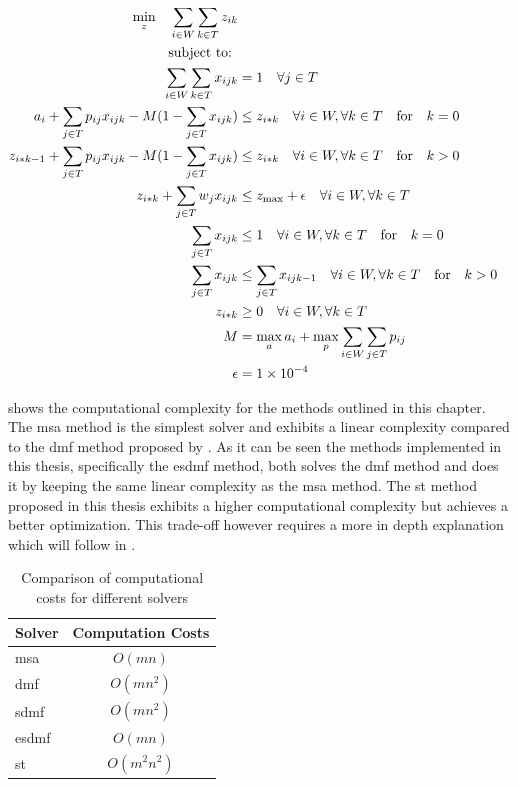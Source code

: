 \documentclass[draft=false]{seal_thesis}
\begin{document}
\begin{align}
    \min_z \quad \sum_{i \in W} \sum_{k \in T} z_{ik}\\
    \text{subject to: } \notag \\
    \sum_{i \in W} \sum_{k \in T} x_{ijk} &= 1 \quad \forall j \in T\\
    a_i + \sum_{j \in T} p_{ij} x_{ijk} - M(1 - \sum_{j \in T} x_{ijk}) &\leq z_{i*k} \quad \forall i \in W, \forall k \in T \quad \text{for} \quad k=0\\
    z_{i*k-1} + \sum_{j \in T} p_{ij} x_{ijk} - M(1 - \sum_{j \in T} x_{ijk}) &\leq z_{i*k} \quad \forall i \in W, \forall k \in T \quad \text{for} \quad k>0\\
    z_{i*k}+ \sum_{j \in T} w_j x_{ijk} &\leq z_{\text{max}} + \epsilon \quad \forall i \in W, \forall k \in T\\
    \sum_{j \in T} x_{ijk} &\leq 1 \quad \forall i \in W, \forall k \in T \quad \text{for} \quad k=0\\
    \sum_{j \in T} x_{ijk} &\leq \sum_{j \in T} x_{ijk-1} \quad \forall i \in W, \forall k \in T \quad \text{for} \quad k>0\\
    z_{i*k} &\geq 0 \quad \forall i \in W, \forall k \in T\\
    M &= \max_a a_i + \max_p \sum_{i \in W} \sum_{j \in T} p_{ij}\\
    \epsilon &= \num{1e-4}
\end{align}

 shows the computational complexity for the methods outlined in this chapter. The \gls{msa} method is the simplest solver and exhibits a linear complexity compared to the \gls{dmf} method proposed by \citet{Zeng2005}. As it can be seen the methods implemented in this thesis, specifically the \gls{esdmf} method, both solves the \gls{dmf} method and does it by keeping the same linear complexity as the \gls{msa} method. The \gls{st} method proposed in this thesis exhibits a higher computational complexity but achieves a better optimization. This trade-off however requires a more in depth explanation which will follow in .

\begin{table}[!ht]
\centering
\begin{tabular}{@{}lc@{}}
\toprule
Solver & Computation Costs \\ \midrule
\gls{msa}    & $O(mn)$           \\
\gls{dmf}   & $O(mn^2)$         \\
\gls{sdmf}  & $O(mn^2)$         \\
\gls{esdmf}  & $O(mn)$           \\
\gls{st} 	   & $O(m^2n^2)$ \\	\bottomrule
\end{tabular}
\caption{Comparison of computational costs for different solvers}
\label{tab:big_oh_solvers}
\end{table}
\end{document}
